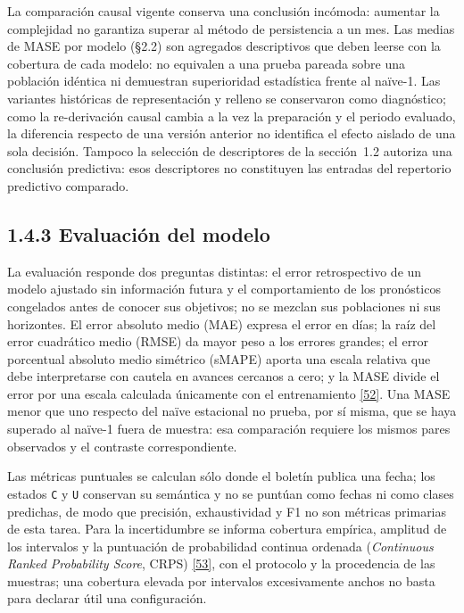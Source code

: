 \documentclass[12pt,letterpaper]{report}
\newcommand{\cita}[1]{\hyperref[bib:#1]{[#1]}}
\begin{document}
La comparación causal vigente conserva una conclusión incómoda: aumentar la complejidad no
garantiza superar al método de persistencia a un mes. Las medias de MASE por modelo (§2.2) son
agregados descriptivos que deben leerse con la cobertura de cada modelo: no equivalen a una prueba
pareada sobre una población idéntica ni demuestran superioridad estadística frente al naïve-1.
Las variantes históricas de representación y relleno se conservaron como diagnóstico; como la
re-derivación causal cambia a la vez la preparación y el periodo evaluado, la diferencia respecto
de una versión anterior no identifica el efecto aislado de una sola decisión. Tampoco la selección
de descriptores de la sección~1.2 autoriza una conclusión predictiva: esos descriptores no
constituyen las entradas del repertorio predictivo comparado.

\subsection{1.4.3 Evaluación del modelo}

La evaluación responde dos preguntas distintas: el error retrospectivo de un modelo
ajustado sin información futura y el comportamiento de los pronósticos congelados antes de
conocer sus objetivos; no se mezclan sus poblaciones ni sus horizontes. El error absoluto medio
(MAE) expresa el error en días; la raíz del error cuadrático medio (RMSE) da mayor peso a los
errores grandes; el error porcentual absoluto medio simétrico (sMAPE) aporta una escala relativa
que debe interpretarse con cautela en avances cercanos a cero; y la MASE
divide el error por una escala calculada únicamente con el entrenamiento \cita{52}. Una
MASE menor que uno respecto del naïve estacional no prueba, por sí misma, que se haya superado
al naïve-1 fuera de muestra: esa comparación requiere los mismos pares observados y el contraste
correspondiente.

Las métricas puntuales se calculan sólo donde el boletín publica una fecha; los estados
\texttt{C} y \texttt{U} conservan su semántica y no se puntúan como fechas ni como clases
predichas, de modo que precisión, exhaustividad y F1 no son métricas primarias de esta tarea.
Para la incertidumbre se informa cobertura empírica, amplitud de los intervalos y la puntuación
de probabilidad continua ordenada (\textit{Continuous Ranked Probability Score}, CRPS)
\cita{53}, con el protocolo y la procedencia de las muestras; una cobertura elevada por
intervalos excesivamente anchos no basta para declarar útil una configuración.
\end{document}
